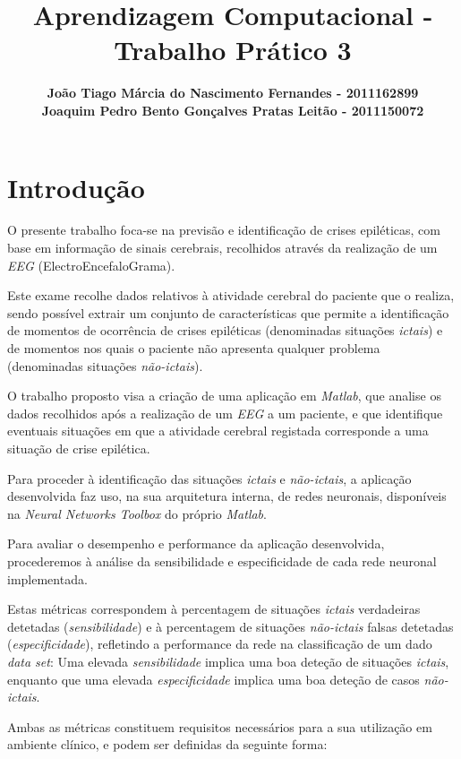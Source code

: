 \documentclass{article}
\title{\bf{Aprendizagem Computacional - Trabalho Prático 3}\vspace{80mm}}
\author{\textbf{João Tiago Márcia do Nascimento Fernandes - 2011162899} \\
\textbf{Joaquim Pedro Bento Gonçalves Pratas Leitão - 2011150072}}
\begin{document}
\maketitle

\pagebreak

\renewcommand*\contentsname{Índice}
\tableofcontents

\pagebreak

\section{Introdução}

O presente trabalho foca-se na previsão e identificação de crises epiléticas, com base em informação de sinais cerebrais, recolhidos através da realização de um \emph{EEG} (ElectroEncefaloGrama).

Este exame recolhe dados relativos à atividade cerebral do paciente que o realiza, sendo possível extrair um conjunto de características que permite a identificação de momentos de ocorrência de crises epiléticas (denominadas situações \emph{ictais}) e de momentos nos quais o paciente não apresenta qualquer problema (denominadas situações \emph{não-ictais}).

O trabalho proposto visa a criação de uma aplicação em \emph{Matlab}, que analise os dados recolhidos após a realização de um \emph{EEG} a um paciente, e que identifique eventuais situações em que a atividade cerebral registada corresponde a uma situação de crise epilética.

Para proceder à identificação das situações \emph{ictais} e \emph{não-ictais}, a aplicação desenvolvida faz uso, na sua arquitetura interna, de redes neuronais, disponíveis na \emph{Neural Networks Toolbox} do próprio \emph{Matlab}.

Para avaliar o desempenho e performance da aplicação desenvolvida, procederemos à análise da sensibilidade e especificidade de cada rede neuronal implementada.

Estas métricas correspondem à percentagem de situações \emph{ictais} verdadeiras detetadas (\emph{sensibilidade}) e à percentagem de situações \emph{não-ictais} falsas detetadas (\emph{especificidade}), refletindo a performance da rede na classificação de um dado \emph{data set}: Uma elevada \emph{sensibilidade} implica uma boa deteção de situações \emph{ictais}, enquanto que uma elevada \emph{especificidade} implica uma boa deteção de casos \emph{não-ictais}.

Ambas as métricas constituem requisitos necessários para a sua utilização em ambiente clínico, e podem ser definidas da seguinte forma:
\end{document}
